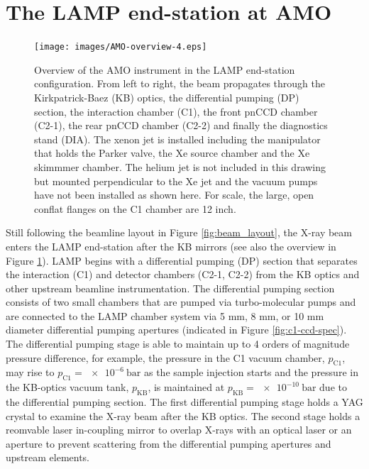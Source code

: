 \section{The LAMP end-station at AMO}\label{sec:LAMP-endstation}
\begin{figure}
	\centering
		\texttt{[image: images/AMO-overview-4.eps]}
	\caption[Overview of the AMO instrument in the LAMP end-station configuration.]{Overview of the AMO instrument in the LAMP end-station configuration. From left to right, the beam propagates through the Kirkpatrick-Baez (KB) optics, the differential pumping (DP) section, the interaction chamber (C1), the front pnCCD chamber (C2-1), the rear pnCCD chamber (C2-2) and finally the diagnostics stand (DIA). The xenon jet is installed including the manipulator that holds the Parker valve, the Xe source chamber and the Xe skimmmer chamber. The helium jet is not included in this drawing but mounted perpendicular to the Xe jet and the vacuum pumps have not been installed as shown here. For scale, the large, open conflat flanges on the C1 chamber are 12 inch.}
	\label{fig:LAMP-overview}
\end{figure}
Still following the beamline layout in Figure \ref{fig:beam_layout}, the X-ray beam enters the LAMP end-station after the KB mirrors (see also the overview in Figure \ref{fig:LAMP-overview}). LAMP begins with a differential pumping (DP) section that separates the interaction (C1) and detector chambers (C2-1, C2-2) from the KB optics and other upstream beamline instrumentation. The differential pumping section consists of two small chambers that are pumped via turbo-molecular pumps and are connected to the LAMP chamber system via 5 mm, 8 mm, or 10 mm diameter differential pumping apertures (indicated in Figure \ref{fig:c1-ccd-spec}). The differential pumping stage is able to maintain up to 4 orders of magnitude pressure difference, for example, the pressure in the C1 vacuum chamber, $p_{\text{C1}}$, may rise to $p_{\text{C1}}=\SI{e-6}{\bar}$ as the sample injection starts and the pressure in the KB-optics vacuum tank, $p_{\text{KB}}$, is maintained at $p_{\text{KB}}=\SI{e-10}{\bar}$ due to the differential pumping section. The first differential pumping stage holds a YAG crystal to examine the X-ray beam after the KB optics. The second stage holds a reomvable laser in-coupling mirror to overlap X-rays with an optical laser or an aperture to prevent scattering from the differential pumping apertures and upstream elements.\\[1\baselineskip]
